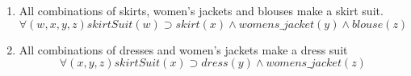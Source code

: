 \documentclass[paper=a4, fontsize=11pt]{scrartcl} %
\numberwithin{equation}{section} %
\numberwithin{figure}{section} %
\numberwithin{table}{section} %
\begin{document}
\begin{enumerate}
\item All combinations of skirts, women's jackets and blouses make a skirt suit.
\begin{equation*}
	\forall(w,x,y,z) skirtSuit(w) \supset skirt(x) \land womens\_jacket(y) \land blouse(z) 
\end{equation*}

\item All combinations of dresses and women's jackets make a dress suit
\begin{equation*}
	\forall(x,y,z) skirtSuit(x) \supset dress(y) \land womens\_jacket(z) 
\end{equation*}

\end{enumerate}
\end{document}
